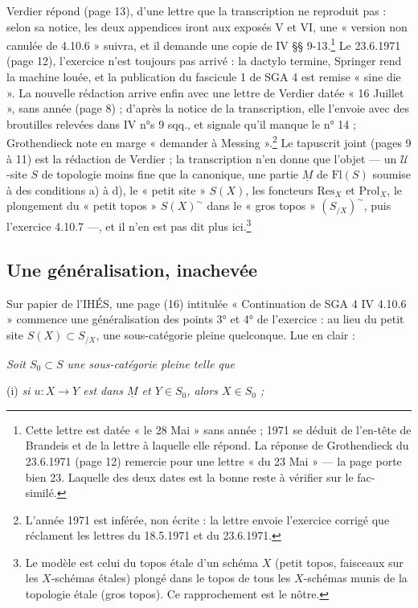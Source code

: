 \documentclass[11pt,a4paper]{article}
\begin{document}
Verdier répond (page 13), d'une lettre que la transcription ne reproduit
pas : selon sa notice, les deux appendices iront aux exposés V et VI, une
« version non canulée de 4.10.6 » suivra, et il demande une copie de IV
§§ 9-13.\footnote{Cette lettre est datée « le 28 Mai » sans année ; 1971 se
déduit de l'en-tête de Brandeis et de la lettre à laquelle elle répond. La
réponse de Grothendieck du 23.6.1971 (page 12) remercie pour une lettre
« du 23 Mai » --- la page porte bien 23. Laquelle des deux dates est la
bonne reste à vérifier sur le fac-similé.}
Le 23.6.1971 (page 12), l'exercice n'est toujours pas arrivé : la dactylo
termine, Springer rend la machine louée, et la publication du fascicule 1 de
SGA 4 est remise « sine die ». La nouvelle rédaction arrive enfin avec une
lettre de Verdier datée « 16 Juillet », sans année (page 8) ; d'après la
notice de la transcription, elle l'envoie avec des broutilles relevées dans
IV n°s 9 sqq., et signale qu'il manque le n° 14 ; Grothendieck note en marge
« demander à Messing ».\footnote{L'année 1971 est inférée, non écrite : la
lettre envoie l'exercice corrigé que réclament les lettres du 18.5.1971 et du
23.6.1971.}
Le tapuscrit joint (pages 9 à 11) est la rédaction de Verdier ; la
transcription n'en donne que l'objet --- un $\mathcal{U}$-site $S$ de
topologie moins fine que la canonique, une partie $\underline{M}$ de
$\mathrm{Fl}(S)$ soumise à des conditions a) à d), le « petit site »
$S(X)$, les foncteurs $\mathrm{Res}_X$ et $\mathrm{Prol}_X$, le plongement du
« petit topos » $S(X)^{\sim}$ dans le « gros topos » $(S_{/X})^{\sim}$, puis
l'exercice 4.10.7 ---, et il n'en est pas dit plus ici.\footnote{Le modèle
est celui du topos étale d'un schéma $X$ (petit topos, faisceaux sur les
$X$-schémas étales) plongé dans le topos de tous les $X$-schémas munis de la
topologie étale (gros topos). Ce rapprochement est le nôtre.}

\subsection*{Une généralisation, inachevée}

Sur papier de l'IHÉS, une page (16) intitulée « Continuation de SGA 4 IV
4.10.6 » commence une généralisation des points 3° et 4° de l'exercice :
au lieu du petit site $S(X) \subset S_{/X}$, une sous-catégorie pleine
quelconque. Lue en clair :

\emph{Soit $S_0 \subset S$ une sous-catégorie pleine telle que}

(i) \emph{si $u : X \to Y$ est dans $\underline{M}$ et $Y \in S_0$, alors
$X \in S_0$ ;}
\end{document}

